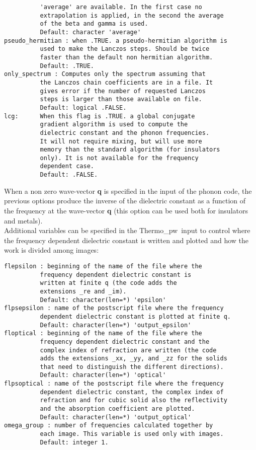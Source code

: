 \documentclass[12pt,a4paper,twoside]{report}
\def\thermo{{\sc Thermo\_pw}}
\begin{document}
\begin{verbatim}
          'average' are available. In the first case no 
          extrapolation is applied, in the second the average 
          of the beta and gamma is used.
          Default: character 'average'
pseudo_hermitian : when .TRUE. a pseudo-hermitian algorithm is 
          used to make the Lanczos steps. Should be twice 
          faster than the default non hermitian algorithm.
          Default: .TRUE.
only_spectrum : Computes only the spectrum assuming that 
          the Lanczos chain coefficients are in a file. It 
          gives error if the number of requested Lanczos 
          steps is larger than those available on file.
          Default: logical .FALSE.
lcg:      When this flag is .TRUE. a global conjugate 
          gradient algorithm is used to compute the 
          dielectric constant and the phonon frequencies. 
          It will not require mixing, but will use more 
          memory than the standard algorithm (for insulators 
          only). It is not available for the frequency 
          dependent case.
          Default: .FALSE.
\end{verbatim}

When a non zero wave-vector {\bf q} is specified in the input of the phonon
code, the previous options produce the inverse of the dielectric 
constant as a function of the frequency at the wave-vector {\bf q}
(this option can be used both for insulators and metals). \\
Additional variables can be specified in the \thermo\ input to control
where the frequency dependent dielectric constant is written and plotted
and how the work is divided among images:

\begin{verbatim}
flepsilon : beginning of the name of the file where the 
          frequency dependent dielectric constant is 
          written at finite q (the code adds the 
          extensions _re and _im).
          Default: character(len=*) 'epsilon'
flpsepsilon : name of the postscript file where the frequency 
          dependent dielectric constant is plotted at finite q.
          Default: character(len=*) 'output_epsilon'
floptical : beginning of the name of the file where the 
          frequency dependent dielectric constant and the 
          complex index of refraction are written (the code 
          adds the extensions _xx, _yy, and _zz for the solids 
          that need to distinguish the different directions).
          Default: character(len=*) 'optical'
flpsoptical : name of the postscript file where the frequency 
          dependent dielectric constant, the complex index of 
          refraction and for cubic solid also the reflectivity 
          and the absorption coefficient are plotted.
          Default: character(len=*) 'output_optical'
omega_group : number of frequencies calculated together by 
          each image. This variable is used only with images.
          Default: integer 1.
\end{verbatim}
\end{document}
